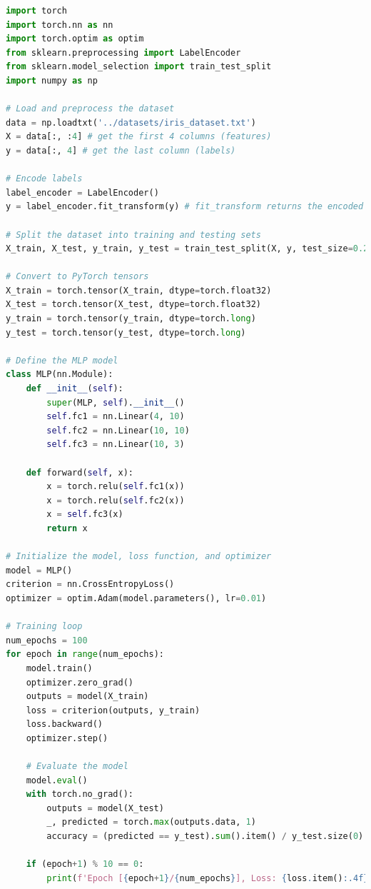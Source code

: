 \documentclass{article}
\begin{document}
\begin{lstlisting}[language=Python]
import torch
import torch.nn as nn
import torch.optim as optim
from sklearn.preprocessing import LabelEncoder
from sklearn.model_selection import train_test_split
import numpy as np

# Load and preprocess the dataset
data = np.loadtxt('../datasets/iris_dataset.txt')
X = data[:, :4] # get the first 4 columns (features)
y = data[:, 4] # get the last column (labels)

# Encode labels
label_encoder = LabelEncoder()
y = label_encoder.fit_transform(y) # fit_transform returns the encoded labels as integers [e.g. setosa -> 0]

# Split the dataset into training and testing sets
X_train, X_test, y_train, y_test = train_test_split(X, y, test_size=0.2, random_state=42)

# Convert to PyTorch tensors
X_train = torch.tensor(X_train, dtype=torch.float32)
X_test = torch.tensor(X_test, dtype=torch.float32)
y_train = torch.tensor(y_train, dtype=torch.long)
y_test = torch.tensor(y_test, dtype=torch.long)

# Define the MLP model
class MLP(nn.Module):
    def __init__(self):
        super(MLP, self).__init__()
        self.fc1 = nn.Linear(4, 10)
        self.fc2 = nn.Linear(10, 10)
        self.fc3 = nn.Linear(10, 3)
    
    def forward(self, x):
        x = torch.relu(self.fc1(x))
        x = torch.relu(self.fc2(x))
        x = self.fc3(x)
        return x

# Initialize the model, loss function, and optimizer
model = MLP()
criterion = nn.CrossEntropyLoss()
optimizer = optim.Adam(model.parameters(), lr=0.01)

# Training loop
num_epochs = 100
for epoch in range(num_epochs):
    model.train()
    optimizer.zero_grad()
    outputs = model(X_train)
    loss = criterion(outputs, y_train)
    loss.backward()
    optimizer.step()
    
    # Evaluate the model
    model.eval()
    with torch.no_grad():
        outputs = model(X_test)
        _, predicted = torch.max(outputs.data, 1) 
        accuracy = (predicted == y_test).sum().item() / y_test.size(0)
    
    if (epoch+1) % 10 == 0:
        print(f'Epoch [{epoch+1}/{num_epochs}], Loss: {loss.item():.4f}, Accuracy: {accuracy * 100:.2f}%')
\end{lstlisting}
\end{document}
